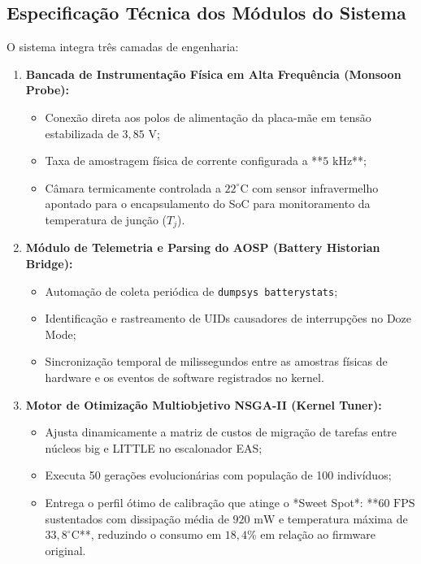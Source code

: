 \subsection{Especificação Técnica dos Módulos do Sistema}
O sistema integra três camadas de engenharia:
\begin{enumerate}
    \item \textbf{Bancada de Instrumentação Física em Alta Frequência (Monsoon Probe):}
    \begin{itemize}
        \item Conexão direta aos polos de alimentação da placa-mãe em tensão estabilizada de $3{,}85\text{ V}$;
        \item Taxa de amostragem física de corrente configurada a **$5\text{ kHz}$**;
        \item Câmara termicamente controlada a $22^\circ\text{C}$ com sensor infravermelho apontado para o encapsulamento do SoC para monitoramento da temperatura de junção ($T_j$).
    \end{itemize}
    \item \textbf{Módulo de Telemetria e Parsing do AOSP (Battery Historian Bridge):}
    \begin{itemize}
        \item Automação de coleta periódica de \texttt{dumpsys batterystats};
        \item Identificação e rastreamento de UIDs causadores de interrupções no Doze Mode;
        \item Sincronização temporal de milissegundos entre as amostras físicas de hardware e os eventos de software registrados no kernel.
    \end{itemize}
    \item \textbf{Motor de Otimização Multiobjetivo NSGA-II (Kernel Tuner):}
    \begin{itemize}
        \item Ajusta dinamicamente a matriz de custos de migração de tarefas entre núcleos big e LITTLE no escalonador EAS;
        \item Executa 50 gerações evolucionárias com população de 100 indivíduos;
        \item Entrega o perfil ótimo de calibração que atinge o *Sweet Spot*: **$60\text{ FPS}$ sustentados com dissipação média de $920\text{ mW}$ e temperatura máxima de $33{,}8^\circ\text{C}$**, reduzindo o consumo em $18{,}4\%$ em relação ao firmware original.
    \end{itemize}
\end{enumerate}
